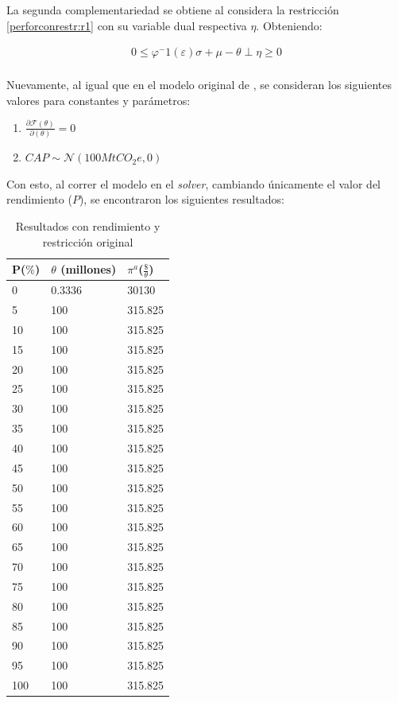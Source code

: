 La segunda complementariedad se obtiene al considera la restricción \ref{perforconrestr:r1} con su variable dual respectiva $\eta$. Obteniendo:

\begin{equation}
\begin{array}{rrclcl}
    0 \leq \varphi^-1 (\varepsilon )\sigma + \mu - \theta \perp \eta \geq 0 \label{compllag21}\\
\end{array}
\end{equation}

Nuevamente, al igual que en el modelo original de , se consideran los siguientes valores para constantes y parámetros:
\begin{enumerate}
    \item $\frac{\partial\mathcal{F}(\theta)}{\partial(\theta)}=0$
    \item $CAP\sim \mathcal{N}(100MtCO_{2}e,0)$
\end{enumerate}

Con esto, al correr el modelo en el \textit{solver}, cambiando únicamente el valor del rendimiento ($P$), se encontraron los siguientes resultados:

\begin{table}[H]
\centering
\begin{tabular}{|l|l|l|}
\hline
\textbf{P($\%$)} & \textbf{$\theta$ (millones)} & \textbf{$\pi^a$($\frac{\$}{\theta}$)} \\ \hline
0 & 0.3336 & 30130 \\ \hline
5 & 100 & 315.825 \\ \hline
10 & 100 & 315.825 \\ \hline
15 & 100 & 315.825 \\ \hline
20 & 100 & 315.825 \\ \hline
25 & 100 & 315.825 \\ \hline
30 & 100 & 315.825 \\ \hline
35 & 100 & 315.825 \\ \hline
40 & 100 & 315.825 \\ \hline
45 & 100 & 315.825 \\ \hline
50 & 100 & 315.825 \\ \hline
55 & 100 & 315.825 \\ \hline
60 & 100 & 315.825 \\ \hline
65 & 100 & 315.825 \\ \hline
70 & 100 & 315.825 \\ \hline
75 & 100 & 315.825 \\ \hline
80 & 100 & 315.825 \\ \hline
85 & 100 & 315.825 \\ \hline
90 & 100 & 315.825 \\ \hline
95 & 100 & 315.825 \\ \hline
100 & 100 & 315.825 \\ \hline
\end{tabular}
\caption{Resultados con rendimiento y restricción original}
\label{tabla:conrestr}
\end{table}

